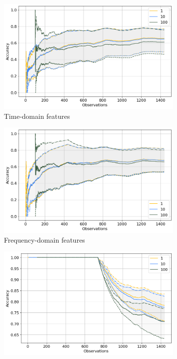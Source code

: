 \begin{figure}[h]
    \centering
    \begin{subfigure}[b]{0.48\textwidth}
        \includegraphics[width=\textwidth]{assets/results/incremental-learning/tumbling-TD.png}
        \caption{Time-domain features}
    \end{subfigure}
    \hfill
    \begin{subfigure}[b]{0.48\textwidth}
        \includegraphics[width=\textwidth]{assets/results/incremental-learning/tumbling-FD.png}
        \caption{Frequency-domain features}
    \end{subfigure}
    \hfill
    \begin{subfigure}[b]{0.48\textwidth}
        \includegraphics[width=\textwidth]{assets/results/incremental-learning/tumbling-TD-severity.png}

\end{subfigure}
\end{figure}
